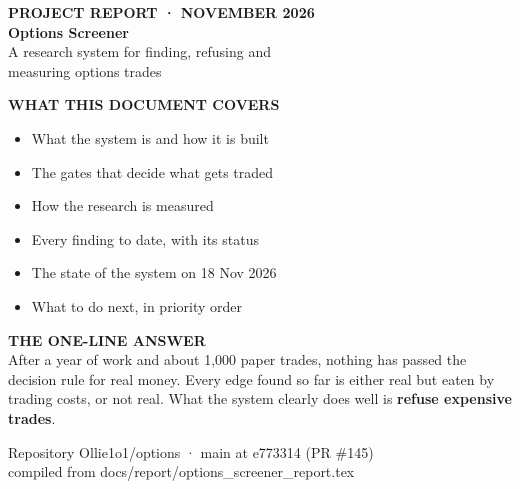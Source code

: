 \documentclass[11pt,a4paper]{article}
\newcommand{\code}[1]{{\ttfamily\small #1}}
\begin{document}
\begin{titlepage}
\vspace*{0.2cm}
{\color{white}\sffamily
  {\small\bfseries\color{gold} PROJECT REPORT · NOVEMBER 2026}\\[0.8em]
  {\fontsize{36}{40}\selectfont\bfseries Options Screener}\\[0.6em]
  {\Large A research system for finding, refusing and\\[0.2em] measuring options trades}
}
\vspace{8.4cm}

\begin{minipage}[t]{0.47\textwidth}
\sffamily\small
{\color{teal}\bfseries WHAT THIS DOCUMENT COVERS}\\[0.4em]
\begin{itemize}[leftmargin=1em]
  \item What the system is and how it is built
  \item The gates that decide what gets traded
  \item How the research is measured
  \item Every finding to date, with its status
  \item The state of the system on 18 Nov 2026
  \item What to do next, in priority order
\end{itemize}
\end{minipage}\hfill
\begin{minipage}[t]{0.47\textwidth}
\sffamily\small
{\color{teal}\bfseries THE ONE-LINE ANSWER}\\[0.4em]
After a year of work and about 1,000 paper trades, nothing has passed the
decision rule for real money. Every edge found so far is either real but
eaten by trading costs, or not real. What the system clearly does well is
\textbf{refuse expensive trades}.
\end{minipage}

\vfill
{\sffamily\footnotesize\color{gray}
Repository \code{Ollie1o1/options} · \code{main} at \code{e773314} (PR \#145)\\
compiled from \code{docs/report/options\_screener\_report.tex}}
\end{titlepage}
\end{document}
